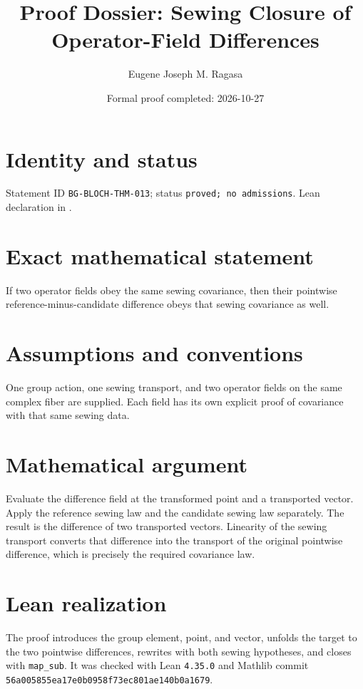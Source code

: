 \documentclass[11pt]{article}
\title{Proof Dossier: Sewing Closure of Operator-Field Differences}
\author{Eugene Joseph M. Ragasa}
\date{Formal proof completed: 2026-10-27}
\begin{document}
\raggedright
\maketitle

\section{Identity and status}
Statement ID \texttt{BG-BLOCH-THM-013}; status \texttt{proved; no admissions}. Lean declaration
 in
.

\section{Exact mathematical statement}
If two operator fields obey the same sewing covariance, then their pointwise
reference-minus-candidate difference obeys that sewing covariance as well.

\section{Assumptions and conventions}
One group action, one sewing transport, and two operator fields on the same complex fiber are
supplied. Each field has its own explicit proof of covariance with that same sewing data.

\section{Mathematical argument}
Evaluate the difference field at the transformed point and a transported vector. Apply the
reference sewing law and the candidate sewing law separately. The result is the difference of
two transported vectors. Linearity of the sewing transport converts that difference into the
transport of the original pointwise difference, which is precisely the required covariance law.

\section{Lean realization}
The proof introduces the group element, point, and vector, unfolds the target to the two
pointwise differences, rewrites with both sewing hypotheses, and closes with
\texttt{map\_sub}. It was checked with Lean \texttt{4.35.0} and Mathlib commit
\texttt{56a005855ea17e0b0958f73ec801ae140b0a1679}.
\end{document}
